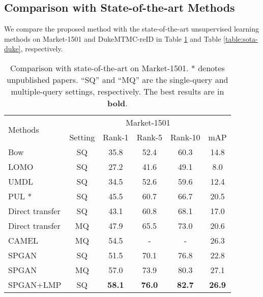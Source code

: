 \documentclass[10pt,twocolumn,letterpaper]{article}
\begin{document}
{\subsection{Comparison with State-of-the-art Methods }
We compare the proposed method with the state-of-the-art unsupervised learning methods on Market-1501 and DukeMTMC-reID in Table \ref{table:sota-market} and Table \ref{table:sota-duke}, respectively.
\setlength{\tabcolsep}{3pt}
\begin{table}[t]
\setlength{\abovecaptionskip}{-0.2cm} 
\setlength{\belowcaptionskip}{-0.4cm}
\begin{center}
\begin{tabular}{l|c|cccc}
\hline
\multicolumn{1}{l|}{\multirow{2}{*}{Methods}}&\multicolumn{5}{c}{Market-1501}\\
\cline{2-6}
\multicolumn{1}{c|}{}&Setting&Rank-1&Rank-5&Rank-10&mAP\\
\hline
\hline
Bow \cite{DBLP:conf/iccv/ZhengSTWWT15}&SQ&35.8&52.4&60.3&14.8\\
LOMO \cite{DBLP:conf/cvpr/LiaoHZL15}&SQ&27.2&41.6&49.1&8.0\\
\hline
UMDL \cite{DBLP:conf/cvpr/PengXWPGHT16}&SQ&34.5&52.6&59.6&12.4\\
PUL \cite{fan17unsupervised}*&SQ&45.5&60.7&66.7&20.5\\
Direct transfer &SQ&43.1&60.8&68.1&17.0\\
Direct transfer &MQ& 47.9&65.5&73.0&20.6 \\
CAMEL \cite{CAMEL} &MQ&54.5&-&-&26.3\\
\hline
SPGAN&SQ& 51.5&70.1&76.8& 22.8\\
SPGAN&MQ&  {57.0}& {73.9}& {80.3}&  {27.1}\\
{SPGAN+LMP}&SQ&\textbf{58.1}&\textbf{76.0}&\textbf{82.7}&\textbf{26.9}\\
\hline
\end{tabular}
\end{center}
\setlength{\abovecaptionskip}{-0cm} 
\caption{Comparison with state-of-the-art on Market-1501. * denotes unpublished papers. ``SQ'' and ``MQ'' are the single-query and multiple-query settings, respectively. The best results are in \textbf{bold}. }
\label{table:sota-market}
\end{table}


}
\end{document}
